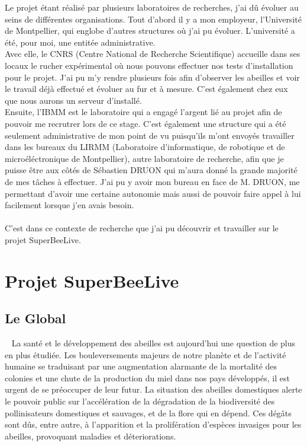 \documentclass[11pt,french,a4paper]{report}
\begin{document}
Le projet étant réalisé par plusieurs laboratoires de recherches, j'ai dû évoluer au seins de différentes organisations. 
Tout d'abord il y a mon employeur, l'Université de Montpellier, qui englobe d'autres structures où j'ai pu évoluer. 
L'université a été, pour moi, une entitée administrative. \\ 
Avec elle, le CNRS (Centre National de Recherche Scientifique) accueille dans ses locaux le rucher expérimental où 
nous pouvons effectuer nos tests d'installation pour le projet. J'ai pu m'y rendre plusieurs fois afin d'observer les abeilles
et voir le travail déjà effectué et évoluer au fur et à mesure. C'est également chez eux que nous aurons un serveur d'installé.\\
Ensuite, l'IBMM est le laboratoire qui a engagé l'argent lié au projet afin de pouvoir me recrutrer lors de ce stage. 
C'est également une structure qui a été seulement administrative de mon point de vu puisqu'ils m'ont envoyés travailler dans 
les bureaux du LIRMM (Laboratoire d'informatique, de robotique et de microéléctronique de Montpellier), autre laboratoire de 
recherche, afin que je puisse être aux côtés de Sébastien DRUON qui m'aura donné la grande majorité de mes tâches à effectuer. 
J'ai pu y avoir mon bureau en face de M. DRUON, me permettant d'avoir une certaine autonomie mais aussi de pouvoir faire
appel à lui facilement lorsque j'en avais besoin.\\
\\
C'est dans ce contexte de recherche que j'ai pu découvrir et travailler sur le projet SuperBeeLive. \\ 


\section{Projet SuperBeeLive}
\subsection{Le Global} 
La santé et le développement des abeilles est aujourd’hui une question de plus en plus étudiée. Les bouleversements
majeurs de notre planète et de l’activité humaine se traduisant par une augmentation alarmante de la mortalité
des colonies et une chute de la production du miel dans nos pays développés, il est urgent de se préoccuper de leur futur. 
La situation des abeilles domestiques alerte le pouvoir public sur l’accélération de la dégradation de la biodiversité des 
pollinisateurs domestiques et sauvages, et de la flore qui en dépend. Ces dégâts sont dûs, entre autre, à l’apparition 
et la prolifération d’espèces invasiges pour les abeilles, provoquant maladies et déteriorations. 
\end{document}
